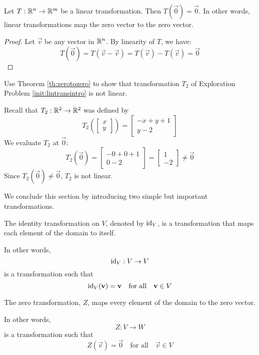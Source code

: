 \documentclass{ximera}
\begin{document}
\begin{theorem}\label{th:zerotozero} Let $T:\mathbb{R}^n\rightarrow \mathbb{R}^m$ be a linear transformation.  Then $T(\vec{0})=\vec{0}$.  In other words, linear transformations map the zero vector to the zero vector.
\end{theorem}
\begin{proof}
Let $\vec{v}$ be any vector in $\mathbb{R}^n$.  By linearity of $T$, we have:
$$T(\vec{0})=T(\vec{v}-\vec{v})=T(\vec{v})-T(\vec{v})=\vec{0}$$
\end{proof}

\begin{example}\label{ex:zerotozero}
Use Theorem \ref{th:zerotozero} to show that transformation $T_2$ of Exploration Problem \ref{init:lintransintro} is not linear.
\begin{explanation}
Recall that $T_2:\mathbb{R}^2\rightarrow\mathbb{R}^2$ was defined by
$$T_2\left(\begin{bmatrix}
x\\
y
\end{bmatrix}\right)=\begin{bmatrix}
-x+y+1\\
y-2
\end{bmatrix}$$
We evaluate $T_2$ at $\vec{0}$:
$$T_2(\vec{0})=\begin{bmatrix}
-0+0+1\\
0-2
\end{bmatrix}=\begin{bmatrix}1\\-2\end{bmatrix}\neq\vec{0}$$
Since $T_2(\vec{0})\neq\vec{0}$, $T_2$ is not linear.
\end{explanation}
\end{example}


We conclude this section by introducing two simple but important transformations.

\begin{definition}\label{def:idtrans}
The identity transformation on $V$, denoted by $\text{id}_V$, is a transformation that maps each element of the domain to itself.

In other words,
$$\text{id}_{V}:V\rightarrow V$$ is a transformation such that $$\text{id}_{V}(\mathbf{v})=\mathbf{v}\quad\text{for all}\quad \mathbf{v} \in V$$
\end{definition}

\begin{definition}\label{def:zerotrans}
The zero transformation, $Z$, maps every element of the domain to the zero vector.

In other words,
$$Z:V\rightarrow W$$ is a transformation such that $$Z(\vec{v})=\vec{0}\quad\text{for all}\quad \vec{v} \in V$$
\end{definition}
\end{document}
